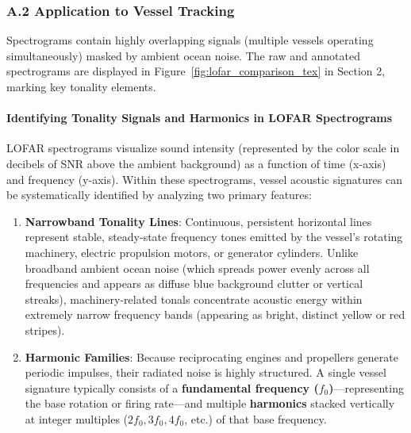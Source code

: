\documentclass[12pt,a4paper]{article}
\begin{document}
\subsubsection{A.2 Application to Vessel Tracking}
Spectrograms contain highly overlapping signals (multiple vessels operating simultaneously) masked by ambient ocean noise. The raw and annotated spectrograms are displayed in Figure~\ref{fig:lofar_comparison_tex} in Section 2, marking key tonality elements.

\paragraph{Identifying Tonality Signals and Harmonics in LOFAR Spectrograms}
LOFAR spectrograms visualize sound intensity (represented by the color scale in decibels of SNR above the ambient background) as a function of time (x-axis) and frequency (y-axis). Within these spectrograms, vessel acoustic signatures can be systematically identified by analyzing two primary features:
\begin{enumerate}
    \item \textbf{Narrowband Tonality Lines}: Continuous, persistent horizontal lines represent stable, steady-state frequency tones emitted by the vessel's rotating machinery, electric propulsion motors, or generator cylinders. Unlike broadband ambient ocean noise (which spreads power evenly across all frequencies and appears as diffuse blue background clutter or vertical streaks), machinery-related tonals concentrate acoustic energy within extremely narrow frequency bands (appearing as bright, distinct yellow or red stripes).
    \item \textbf{Harmonic Families}: Because reciprocating engines and propellers generate periodic impulses, their radiated noise is highly structured. A single vessel signature typically consists of a \textbf{fundamental frequency ($f_0$)}---representing the base rotation or firing rate---and multiple \textbf{harmonics} stacked vertically at integer multiples ($2f_0, 3f_0, 4f_0$, etc.) of that base frequency.
\end{enumerate}
\end{document}
